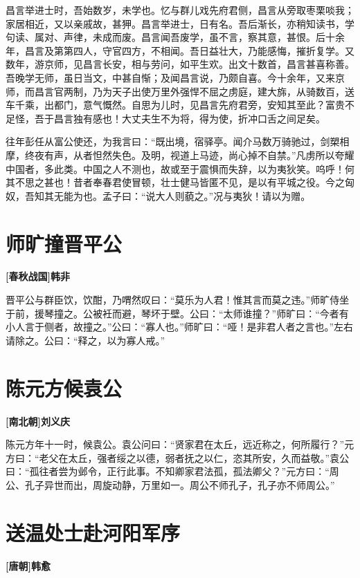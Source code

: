 \documentclass[UTF8,titlepage,oneside]{ctexbook}
\begin{document}
昌言举进士时，吾始数岁，未学也。忆与群儿戏先府君侧，昌言从旁取枣栗啖我；家居相近，又以亲戚故，甚狎。昌言举进士，日有名。吾后渐长，亦稍知读书，学句读、属对、声律，未成而废。昌言闻吾废学，虽不言，察其意，甚恨。后十余年，昌言及第第四人，守官四方，不相闻。吾日益壮大，乃能感悔，摧折复学。又数年，游京师，见昌言长安，相与劳问，如平生欢。出文十数首，昌言甚喜称善。吾晚学无师，虽日当文，中甚自惭；及闻昌言说，乃颇自喜。今十余年，又来京师，而昌言官两制，乃为天子出使万里外强悍不屈之虏庭，建大旆，从骑数百，送车千乘，出都门，意气慨然。自思为儿时，见昌言先府君旁，安知其至此？富贵不足怪，吾于昌言独有感也！大丈夫生不为将，得为使，折冲口舌之间足矣。


往年彭任从富公使还，为我言曰：“既出境，宿驿亭。闻介马数万骑驰过，剑槊相摩，终夜有声，从者怛然失色。及明，视道上马迹，尚心掉不自禁。”凡虏所以夸耀中国者，多此类。中国之人不测也，故或至于震惧而失辞，以为夷狄笑。呜呼！何其不思之甚也！昔者奉春君使冒顿，壮士健马皆匿不见，是以有平城之役。今之匈奴，吾知其无能为也。孟子曰：“说大人则藐之。”况与夷狄！请以为赠。



\chapter*{师旷撞晋平公}
\begin{center}
	\textbf{[春秋战国]韩非}
\end{center}

晋平公与群臣饮，饮酣，乃喟然叹曰：“莫乐为人君！惟其言而莫之违。”师旷侍坐于前，援琴撞之。公被衽而避，琴坏于壁。公曰：“太师谁撞？”师旷曰：“今者有小人言于侧者，故撞之。”公曰：“寡人也。”师旷曰：“哑！是非君人者之言也。”左右请除之。公曰：“释之，以为寡人戒。”


\chapter*{陈元方候袁公}
\begin{center}
	\textbf{[南北朝]刘义庆}
\end{center}

陈元方年十一时，候袁公。袁公问曰：“贤家君在太丘，远近称之，何所履行？”元方曰：“老父在太丘，强者绥之以德，弱者抚之以仁，恣其所安，久而益敬。”袁公曰：“孤往者尝为邺令，正行此事。不知卿家君法孤，孤法卿父？”元方曰：“周公、孔子异世而出，周旋动静，万里如一。周公不师孔子，孔子亦不师周公。”


\chapter*{送温处士赴河阳军序}
\begin{center}
	\textbf{[唐朝]韩愈}
\end{center}
\end{document}
